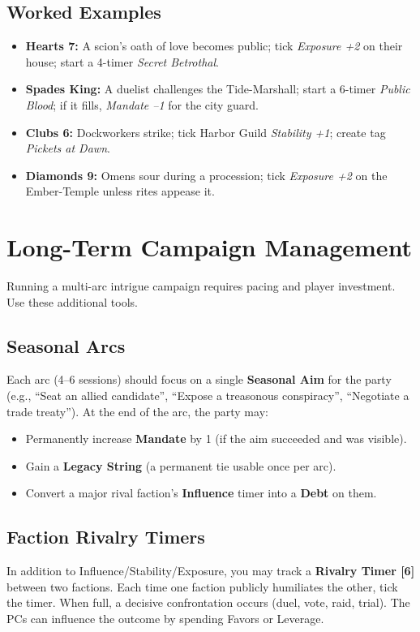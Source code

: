 \documentclass[11pt]{article}
\begin{document}
\subsection*{Worked Examples}
\begin{itemize}
  \item \textbf{Hearts 7:} A scion's oath of love becomes public; tick \emph{Exposure +2} on their house; start a 4-timer \emph{Secret Betrothal}.
  \item \textbf{Spades King:} A duelist challenges the Tide-Marshall; start a 6-timer \emph{Public Blood}; if it fills, \emph{Mandate --1} for the city guard.
  \item \textbf{Clubs 6:} Dockworkers strike; tick Harbor Guild \emph{Stability +1}; create tag \emph{Pickets at Dawn}.
  \item \textbf{Diamonds 9:} Omens sour during a procession; tick \emph{Exposure +2} on the Ember-Temple unless rites appease it.
\end{itemize}

\section{Long-Term Campaign Management}
Running a multi-arc intrigue campaign requires pacing and player investment. Use these additional tools.

\subsection*{Seasonal Arcs}
Each arc (4--6 sessions) should focus on a single \textbf{Seasonal Aim} for the party (e.g., ``Seat an allied candidate'', ``Expose a treasonous conspiracy'', ``Negotiate a trade treaty''). At the end of the arc, the party may:
\begin{itemize}
  \item Permanently increase \textbf{Mandate} by 1 (if the aim succeeded and was visible).
  \item Gain a \textbf{Legacy String} (a permanent tie usable once per arc).
  \item Convert a major rival faction's \textbf{Influence} timer into a \textbf{Debt} on them.
\end{itemize}

\subsection*{Faction Rivalry Timers}
In addition to Influence/Stability/Exposure, you may track a \textbf{Rivalry Timer [6]} between two factions. Each time one faction publicly humiliates the other, tick the timer. When full, a decisive confrontation occurs (duel, vote, raid, trial). The PCs can influence the outcome by spending Favors or Leverage.
\end{document}
